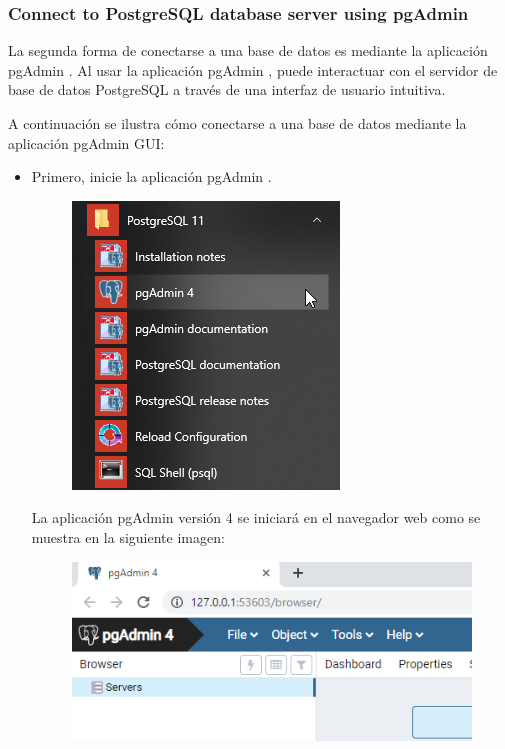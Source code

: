 \documentclass[10pt]{article}
\newcommand{\postgres}[1]{{\textcolor{R}{PostgreSQL} #1}}
\newcommand{\pgAdmin}[1]{{\textcolor{B}{pgAdmin} #1}}
\begin{document}
\subsubsection{Connect to \postgres{} database server using \pgAdmin{}}

La segunda forma de conectarse a una base de datos es mediante la aplicación \pgAdmin{}. Al usar la aplicación \pgAdmin{}, puede interactuar con el servidor de base de datos \postgres{} a través de una interfaz de usuario intuitiva.

A continuación se ilustra cómo conectarse a una base de datos mediante la aplicación \pgAdmin{} GUI:

\begin{itemize}
\item Primero, inicie la aplicación \pgAdmin{}.

\begin{figure}[H]
  \begin{center}
  	 \includegraphics{figures/cap2/img4.png}	 
	 \renewcommand{\arraystretch}{1.3}
  \end{center}
\end{figure}

La aplicación \pgAdmin{} versión 4 se iniciará en el navegador web como se muestra en la siguiente imagen:

\begin{figure}[H]
  \begin{center}
  	 \includegraphics{figures/cap2/img5.png}	 
	 \renewcommand{\arraystretch}{1.3}
  \end{center}
\end{figure}


\end{itemize}
\end{document}
